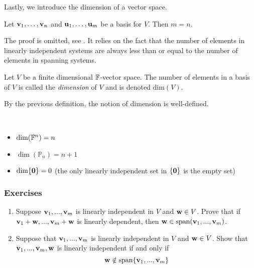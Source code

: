 \documentclass{article}
\begin{document}
Lastly, we introduce the dimension of a vector space.

\begin{proposition}
Let ${\mathbf{v}}_1,\ldots, {\mathbf{v}}_n$ and ${\mathbf{u}}_1,\ldots, {\mathbf{u}}_m$ be a basis for $V$. Then $m=n$.
\end{proposition}

The proof is omitted, see \cite[Chapter 2, Proposition 2.35]{linalgright}. It relies on the fact that the number of elements in linearly independent systems are always less than or equal to the number of elements in spanning systems. 

\begin{definition}
Let $V$ be a finite dimensional ${\mathbb{F}}$-vector space. The number of elements in a basis of $V$ is called the \emph{dimension} of $V$ and is denoted $\mathrm{dim}(V)$.
\end{definition}

By the previous definition, the notion of dimension is well-defined. 

\begin{example}
\textcolor{white}{skip}
\begin{itemize}
    \item $\dim({\mathbb{F}}^n) = n$
    \item $\dim(\mathbb{P}_n)= n+1$
    \item $\dim \{ {\mathbf{0}} \} = 0$ (the only linearly independent set in $\{ {\mathbf{0}} \}$ is the empty set)
\end{itemize}
\end{example}

\subsubsection{Exercises}
\begin{enumerate}
 \item Suppose ${\mathbf{v}}_{1},...,{\mathbf{v}}_{m}$ is linearly independent in $V$
and ${\mathbf{w}}\in V$. Prove that if ${\mathbf{v}}_{1}+{\mathbf{w}},...,{\mathbf{v}}_{m}+{\mathbf{w}}$ is linearly dependent,
then ${\mathbf{w}}\in\text{span}({\mathbf{v}}_{1},...,{\mathbf{v}}_{m})$. 
\item Suppose that ${\mathbf{v}}_{1},...,{\mathbf{v}}_{m}$ is linearly independent
in $V$ and ${\mathbf{w}}\in V$. Show that ${\mathbf{v}}_{1},...,{\mathbf{v}}_{m},{\mathbf{w}}$ is linearly independent if and only if 
$${\mathbf{w}}\notin\text{span}\{{\mathbf{v}}_{1},...,{\mathbf{v}}_{m}\}$$
\end{enumerate}
\end{document}
